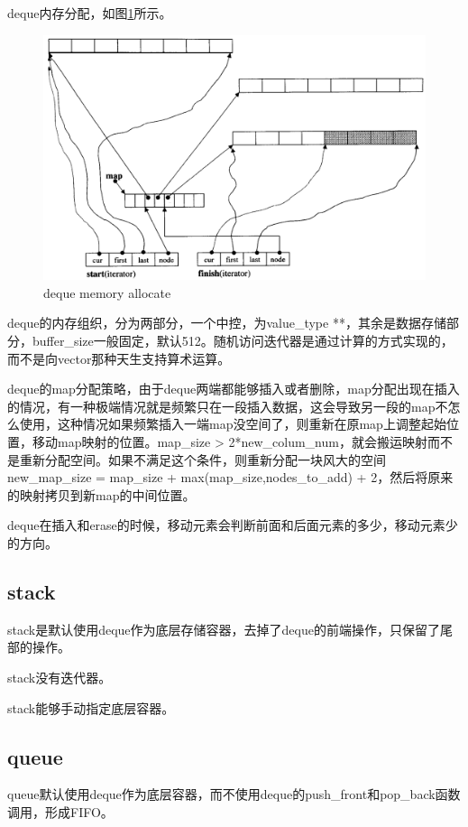 \documentclass[a4paper,fontset=mac]{ctexart}
\begin{document}
	deque内存分配，如图\ref{deque memory allocate}所示。
	\begin{figure}
		\centering
		\includegraphics[width=5in]{deque_alloc_memery}
		\caption{deque memory allocate}
		\label{deque memory allocate} %
	\end{figure}
	
	deque的内存组织，分为两部分，一个中控，为value\_type **，其余是数据存储部分，buffer\_size一般固定，默认512。随机访问迭代器是通过计算的方式实现的，而不是向vector那种天生支持算术运算。
	
	deque的map分配策略，由于deque两端都能够插入或者删除，map分配出现在插入的情况，有一种极端情况就是频繁只在一段插入数据，这会导致另一段的map不怎么使用，这种情况如果频繁插入一端map没空间了，则重新在原map上调整起始位置，移动map映射的位置。map\_size > 2*new\_colum\_num，就会搬运映射而不是重新分配空间。如果不满足这个条件，则重新分配一块风大的空间 new\_map\_size = map\_size + max(map\_size,nodes\_to\_add) + 2，然后将原来的映射拷贝到新map的中间位置。
	
	deque在插入和erase的时候，移动元素会判断前面和后面元素的多少，移动元素少的方向。
	
	\subsection{stack}
	stack是默认使用deque作为底层存储容器，去掉了deque的前端操作，只保留了尾部的操作。
	
	stack没有迭代器。
	
	stack能够手动指定底层容器。
	\subsection{queue}
	queue默认使用deque作为底层容器，而不使用deque的push\_front和pop\_back函数调用，形成FIFO。
	
\end{document}
